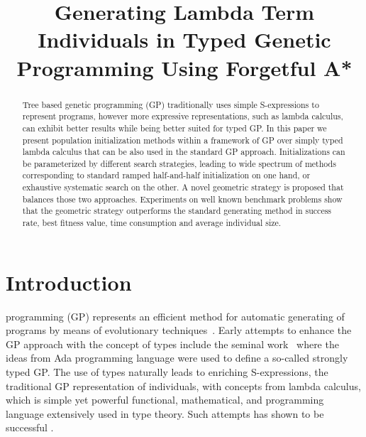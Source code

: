 \documentclass[conference]{IEEEtran}
\begin{document}
\title{Generating Lambda Term Individuals in Typed Genetic Programming Using Forgetful A*}

\author{
\and
{}
}




\maketitle


\begin{abstract}
Tree based genetic programming (GP) traditionally uses simple S-expressions to represent programs, however more expressive representations, such as lambda calculus, can exhibit better results while being better suited for typed GP. In this paper we present population initialization methods within a framework of GP over simply typed lambda calculus that can be also used in the standard GP approach. Initializations can be parameterized by different search strategies, leading to wide spectrum of methods corresponding to standard ramped half-and-half initialization on one hand, or exhaustive systematic search on the other. A novel geometric strategy is proposed that balances those two approaches. Experiments on well known benchmark problems show that the geometric strategy outperforms the standard generating method in success rate, best fitness value, time consumption and average individual size.
\end{abstract}

\section{Introduction}
 programming (GP) represents an efficient method for automatic generating of programs by means of evolutionary techniques~\cite{koza92,koza03}. Early attempts to enhance the GP approach with the concept of types include the seminal work~\cite{montana95} where the ideas from Ada programming language were used to define a so-called strongly typed GP.   
The use of types naturally leads to enriching S-expressions,
the traditional GP representation of individuals, with concepts from
lambda calculus, which is simple yet powerful functional, mathematical, and programming 
language extensively used in type theory. Such attempts has shown to be 
successful \cite{yu01}. 
\end{document}
